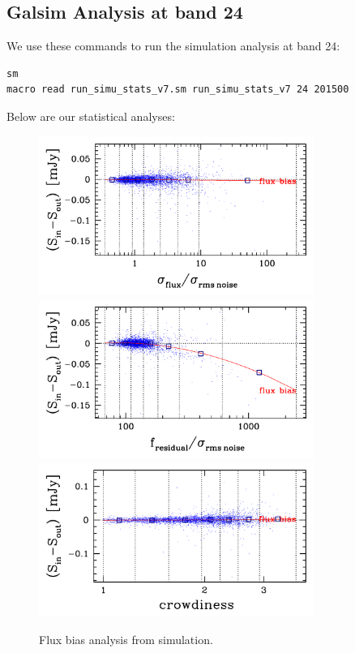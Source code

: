 \documentclass[11pt,a4paper]{article}
\begin{document}
\subsection{Galsim Analysis at band 24}

We use these commands to run the simulation analysis at band 24:

\begin{lstlisting}[language=bash]
sm
macro read run_simu_stats_v7.sm run_simu_stats_v7 24 201500
\end{lstlisting}

Below are our statistical analyses:

\begin{figure}[H]
	\includegraphics[width=0.8\textwidth]{galsim_24_fbias_1}
	\includegraphics[width=0.8\textwidth]{galsim_24_fbias_2}
	\includegraphics[width=0.8\textwidth]{galsim_24_fbias_3}
	\caption{Flux bias analysis from simulation.}
\end{figure}
\end{document}
